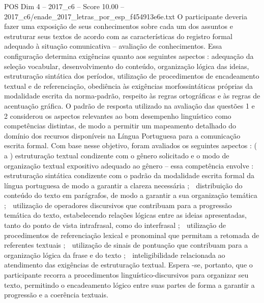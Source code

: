 \begin{textsample}{POS Dim 4 – 2017\_c6 – Score 10.00 – 2017\_c6/enade\_2017\_letras\_por\_esp\_f454913e6e.txt}
O participante deveria fazer uma exposição de seus conhecimentos sobre cada um dos assuntos e estruturar seus textos de acordo com as características do registro formal adequado à situação comunicativa – avaliação de conhecimentos.
Essa configuração determina exigências quanto aos seguintes aspectos : adequação da seleção vocabular, desenvolvimento do conteúdo, organização lógica das ideias, estruturação sintática dos períodos, utilização de procedimentos de encadeamento textual e de referenciação, obediência às exigências morfossintáticas próprias da modalidade escrita da norma-padrão, respeito às regras ortográficas e às regras de acentuação gráfica.
O padrão de resposta utilizado na avaliação das questões 1 e 2 considerou os aspectos relevantes ao bom desempenho linguístico como competências distintas, de modo a permitir um mapeamento detalhado do domínio dos recursos disponíveis na Língua Portuguesa para a comunicação escrita formal.
Com base nesse objetivo, foram avaliados os seguintes aspectos : ( a ) estruturação textual condizente com o gênero solicitado e o modo de organização textual expositivo adequado ao gênero – essa competência envolve :  estruturação sintática condizente com o padrão da modalidade escrita formal da língua portuguesa de modo a garantir a clareza necessária ;  distribuição do conteúdo do texto em parágrafos, de modo a garantir a sua organização temática ;  utilização de operadores discursivos que contribuam para a progressão temática do texto, estabelecendo relações lógicas entre as ideias apresentadas, tanto do ponto de vista intrafrasal, como do interfrasal ;  utilização de procedimentos de referenciação lexical e pronominal que permitam a retomada de referentes textuais ;  utilização de sinais de pontuação que contribuam para a organização lógica da frase e do texto ;  inteligibilidade relacionada ao atendimento das exigências de estruturação textual.
Espera -se, portanto, que o participante recorra a procedimentos linguístico-discursivos para organizar seu texto, permitindo o encadeamento lógico entre suas partes de forma a garantir a progressão e a coerência textuais.

\end{textsample}
